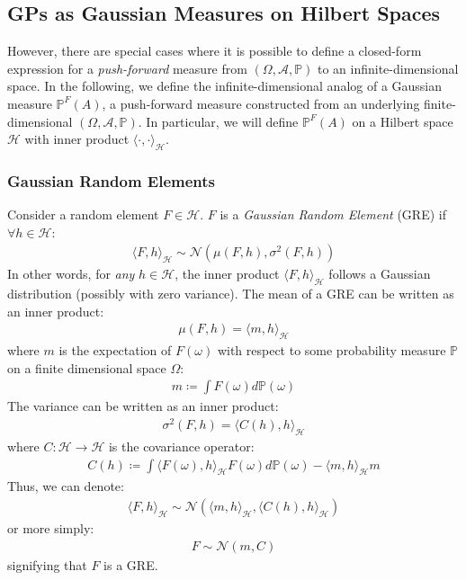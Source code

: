 \documentclass{article}
\numberwithin{equation}{section}
\begin{document}
\subsection{GPs as Gaussian Measures on Hilbert Spaces}
However, there are special cases where it is possible to define a closed-form expression for a \textit{push-forward} measure from $(\Omega, \mathcal{A}, \mathbb{P})$ to an infinite-dimensional space. In the following, we define the infinite-dimensional analog of a Gaussian measure  $\mathbb{P}^{F}(A)$, a push-forward measure constructed from an underlying finite-dimensional $(\Omega, \mathcal{A}, \mathbb{P})$. In particular, we will define $\mathbb{P}^{F}(A)$ on a Hilbert space $\mathcal{H}$ with inner product $\langle \cdot, \cdot \rangle_\mathcal{H}$.

\subsubsection{Gaussian Random Elements}
 Consider a random element $F \in \mathcal{H}$. $F$ is a \textit{Gaussian Random Element} (GRE) if $\forall h \in \mathcal{H}$:
\begin{align}
    \langle F, h \rangle_\mathcal{H} \sim \mathcal{N}(\mu(F, h), \sigma^2(F, h))
\end{align}
In other words, for \textit{any} $h \in \mathcal{H}$, the inner product $\langle F, h \rangle_\mathcal{H}$ follows a Gaussian distribution (possibly with zero variance). The mean of a GRE can be written as an inner product:
\begin{align}
\mu(F, h) = \langle m, h\rangle_{\mathcal{H}}
\end{align}
where $m$ is the expectation of $F(\omega)$ with respect to some probability measure $\mathbb{P}$ on a finite dimensional space $\Omega$:
\begin{align}
    \label{gm-mean}
    m \coloneqq \int F(\omega) d \mathbb{P}(\omega)
\end{align}
The variance can be written as an inner product:
\begin{align}
\sigma^2(F, h) = \langle C(h), h\rangle_{\mathcal{H}}
\end{align}
where $C: \mathcal{H} \rightarrow \mathcal{H}$ is the covariance operator:
\begin{align}
    \label{gm-covariance}
    C(h) \coloneqq \int \langle F(\omega), h\rangle_{\mathcal{H}} F(\omega)d \mathbb{P}(\omega) - \langle m, h\rangle_{\mathcal{H}} m
\end{align}
Thus, we can denote:
\begin{align}
    \langle F, h\rangle_{\mathcal{H}} \sim \mathcal{N}\left(  \langle m, h\rangle_{\mathcal{H}},  \langle C(h), h\rangle_{\mathcal{H}}\right)
\end{align}
or more simply:
\begin{align}
    F \sim \mathcal{N}(m, C)
\end{align}
signifying that $F$ is a GRE.
\end{document}

